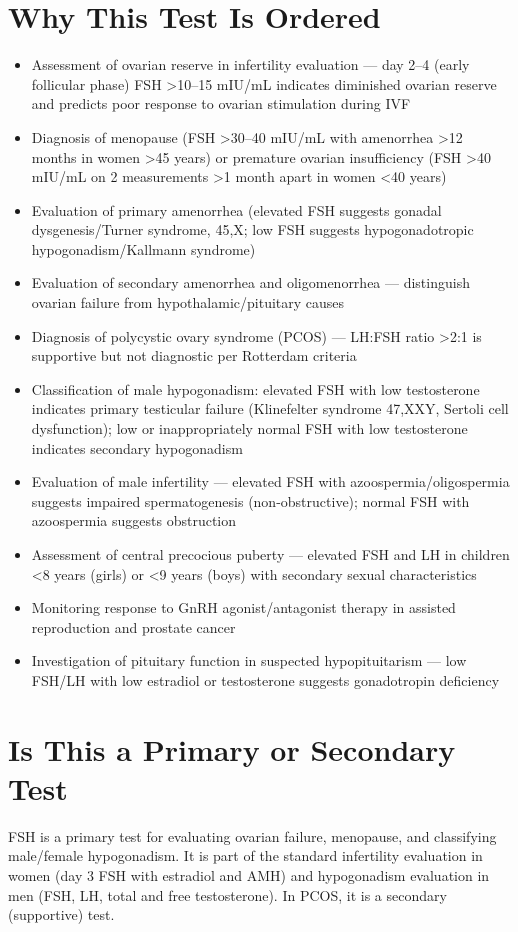 \section*{Why This Test Is Ordered}
\begin{itemize}
  \item Assessment of ovarian reserve in infertility evaluation --- day 2--4 (early follicular phase) FSH >10--15 mIU/mL indicates diminished ovarian reserve and predicts poor response to ovarian stimulation during IVF
  \item Diagnosis of menopause (FSH >30--40 mIU/mL with amenorrhea >12 months in women >45 years) or premature ovarian insufficiency (FSH >40 mIU/mL on 2 measurements >1 month apart in women <40 years)
  \item Evaluation of primary amenorrhea (elevated FSH suggests gonadal dysgenesis/Turner syndrome, 45,X; low FSH suggests hypogonadotropic hypogonadism/Kallmann syndrome)
  \item Evaluation of secondary amenorrhea and oligomenorrhea --- distinguish ovarian failure from hypothalamic/pituitary causes
  \item Diagnosis of polycystic ovary syndrome (PCOS) --- LH:FSH ratio >2:1 is supportive but not diagnostic per Rotterdam criteria
  \item Classification of male hypogonadism: elevated FSH with low testosterone indicates primary testicular failure (Klinefelter syndrome 47,XXY, Sertoli cell dysfunction); low or inappropriately normal FSH with low testosterone indicates secondary hypogonadism
  \item Evaluation of male infertility --- elevated FSH with azoospermia/oligospermia suggests impaired spermatogenesis (non-obstructive); normal FSH with azoospermia suggests obstruction
  \item Assessment of central precocious puberty --- elevated FSH and LH in children <8 years (girls) or <9 years (boys) with secondary sexual characteristics
  \item Monitoring response to GnRH agonist/antagonist therapy in assisted reproduction and prostate cancer
  \item Investigation of pituitary function in suspected hypopituitarism --- low FSH/LH with low estradiol or testosterone suggests gonadotropin deficiency
\end{itemize}

\section*{Is This a Primary or Secondary Test}
FSH is a primary test for evaluating ovarian failure, menopause, and classifying male/female hypogonadism. It is part of the standard infertility evaluation in women (day 3 FSH with estradiol and AMH) and hypogonadism evaluation in men (FSH, LH, total and free testosterone). In PCOS, it is a secondary (supportive) test.

